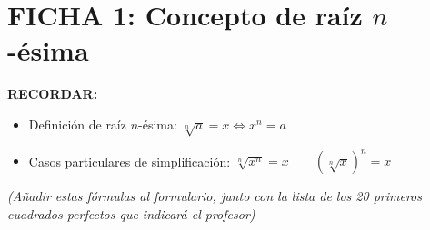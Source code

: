 \documentclass[10pt, a4paper]{article}
\newenvironment{boxsummary}{%
  \def\FrameCommand{\fcolorbox{black}{graybox}}%
  \MakeFramed{\FrameRestore}%
  \small\textbf{RECORDAR:}\par\smallskip
}{%
  \endMakeFramed
}
\begin{document}
\section*{FICHA 1: Concepto de raíz $n$-ésima}

\begin{boxsummary}
\begin{itemize}[leftmargin=*, itemsep=2pt]
    \item Definición de raíz $n$-ésima: $\sqrt[n]{a} = x \Leftrightarrow x^n = a$
    \item Casos particulares de simplificación: $\sqrt[n]{x^n} = x \qquad (\sqrt[n]{x})^n = x$
\end{itemize}
\textit{(Añadir estas fórmulas al formulario, junto con la lista de los 20 primeros cuadrados perfectos que indicará el profesor)}
\end{boxsummary}
\end{document}
